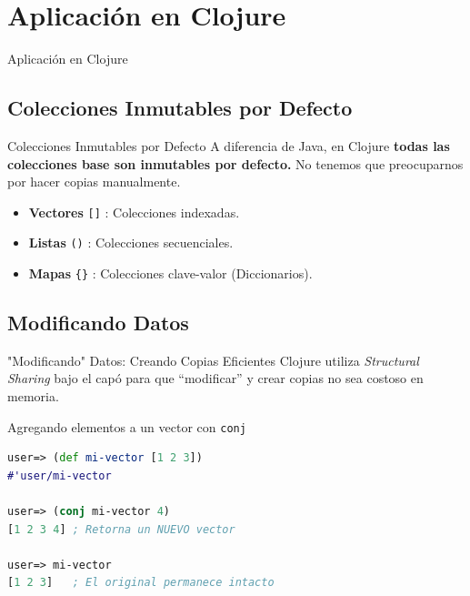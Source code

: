 \documentclass{beamer}
\begin{document}
\section{Aplicación en Clojure}

\begin{emptyframe}
    Aplicación en Clojure
\end{emptyframe}

\subsection{Colecciones Inmutables por Defecto}
\begin{frame}[fragile]{Colecciones Inmutables por Defecto}
    A diferencia de Java, en Clojure \textbf{todas las colecciones base son inmutables por defecto.} No tenemos que preocuparnos por hacer copias manualmente.

    \begin{itemize}
        \item \textbf{Vectores} \texttt{[]} : Colecciones indexadas.
        \item \textbf{Listas} \texttt{()} : Colecciones secuenciales.
        \item \textbf{Mapas} \texttt{\{\}} : Colecciones clave-valor (Diccionarios).
    \end{itemize}

    \vspace{0.3cm}
    \begin{center}
    
    \end{center}
\end{frame}

\subsection{Modificando Datos}
\begin{frame}[fragile]{"Modificando" Datos: Creando Copias Eficientes}
    Clojure utiliza \textit{Structural Sharing} bajo el capó para que ``modificar'' y crear copias no sea costoso en memoria.

    \begin{exampleblock}{Agregando elementos a un vector con \texttt{conj}}
        \begin{lstlisting}[language=Clojure]
user=> (def mi-vector [1 2 3])
#'user/mi-vector

user=> (conj mi-vector 4)
[1 2 3 4] ; Retorna un NUEVO vector

user=> mi-vector
[1 2 3]   ; El original permanece intacto
        \end{lstlisting}
    \end{exampleblock}
\end{frame}
\end{document}
